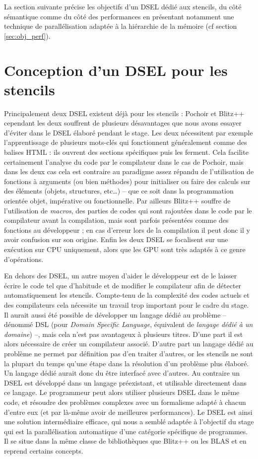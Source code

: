 La section suivante précise les objectifs d'un DSEL dédié aux stencils, du côté sémantique comme du côté des performances en présentant notamment une technique de parallélisation adaptée à la hiérarchie de la mémoire (cf section \ref{sec:obj_perf}).

\section{Conception d'un DSEL pour les stencils}

Principalement deux DSEL existent déjà pour les stencils : \textsf{Pochoir} et \textsf{Blitz++} cependant les deux souffrent de plusieurs désavantages que nous avons essayer d'éviter dans le DSEL élaboré pendant le stage. Les deux nécessitent par exemple l'apprentissage de plusieurs mots-clés qui fonctionnent généralement comme des balises HTML : ils ouvrent des sections spécifiques puis les ferment. Cela facilite certainement l'analyse du code par le compilateur dans le cas de \textsf{Pochoir}, mais dans les deux cas cela est contraire au paradigme assez répandu de l'utilisation de fonctions à arguments (ou bien méthodes) pour initialiser ou faire des calculs sur des éléments (objets, structures, etc\ldots) -- que ce soit dans la programmation orientée objet, impérative ou fonctionnelle. Par ailleurs \textsf{Blitz++} souffre de l'utilisation de \emph{macros}, des parties de codes qui sont rajoutées dans le code par le compilateur avant la compilation, mais sont parfois présentées comme des fonctions au développeur ; en cas d'erreur lors de la compilation il peut donc il y avoir confusion sur son origine. Enfin les deux DSEL se focalisent sur une exécution sur CPU uniquement, alors que les GPU sont très adaptés à ce genre d'opérations.

En dehors des DSEL, un autre moyen d'aider le développeur est de le laisser écrire le code tel que d'habitude et de modifier le compilateur afin de détecter automatiquement les stencils. Compte-tenu de la complexité des codes actuels et des compilateurs cela nécessite un travail trop important pour le cadre du stage. Il aurait aussi été possible de développer un langage dédié au problème -- dénommé DSL (pour \emph{Domain Specific Language}, équivalent de \emph{langage dédié à un domaine}) --, mais cela n'est pas avantageux à plusieurs titres. D'une part il est alors nécessaire de créer un compilateur associé. D'autre part un langage dédié au problème ne permet par définition pas d'en traiter d'autres, or les stencils ne sont la plupart du temps qu'une étape dans la résolution d'un problème plus élaboré. Un langage dédié aurait donc du être interfacé avec d'autres. Au contraire un DSEL est développé dans un langage préexistant, et utilisable directement dans ce langage. Le programmeur peut alors utiliser plusieurs DSEL dans le même code, et résoudre des problèmes complexes avec un formalisme adapté à chacun d'entre eux (et par là-même avoir de meilleures performances). Le DSEL est ainsi une solution intermédiaire efficace, qui nous a semblé adaptée à l'objectif du stage qui est la parallélisation automatique d'une catégorie spécifique de programmes. Il se situe dans la même classe de bibliothèques que \textsf{Blitz++} ou les \textsf{BLAS} et en reprend certains concepts.

